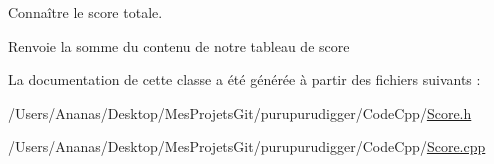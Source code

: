 Connaître le score totale. 

\begin{DoxyReturn}{Renvoie}
la somme du contenu de notre tableau de score 
\end{DoxyReturn}


La documentation de cette classe a été générée à partir des fichiers suivants \-:\begin{DoxyCompactItemize}
\item 
/\-Users/\-Ananas/\-Desktop/\-Mes\-Projets\-Git/purupurudigger/\-Code\-Cpp/\hyperlink{_score_8h}{Score.\-h}\item 
/\-Users/\-Ananas/\-Desktop/\-Mes\-Projets\-Git/purupurudigger/\-Code\-Cpp/\hyperlink{_score_8cpp}{Score.\-cpp}\end{DoxyCompactItemize}
